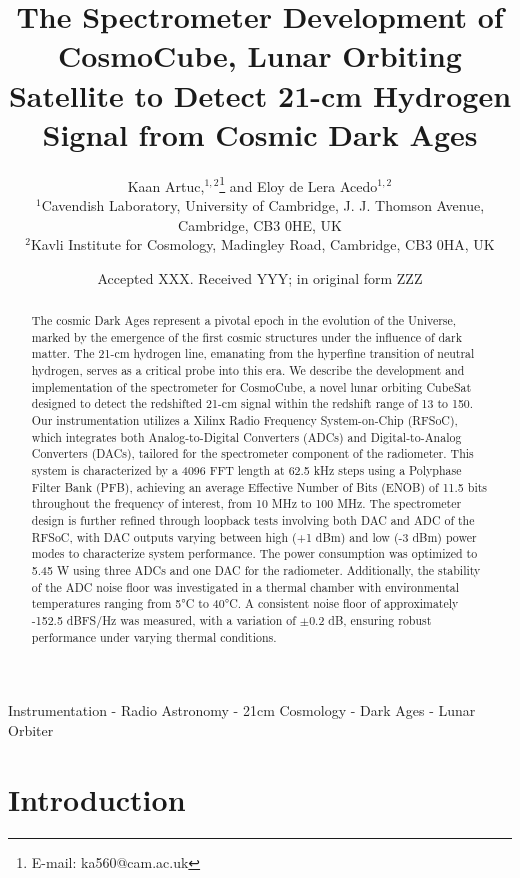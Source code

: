 \documentclass[fleqn,usenatbib]{rasti}
\title[The Spectrometer Development of CosmoCube to Detect 21-cm Signal]{The Spectrometer Development of CosmoCube, Lunar Orbiting Satellite to Detect 21-cm Hydrogen Signal from Cosmic Dark Ages}
\author[K. Artuc et al.]{
Kaan Artuc,$^{1,2}$\thanks{E-mail: ka560@cam.ac.uk}
and Eloy de Lera Acedo$^{1,2}$
\\
$^{1}$Cavendish Laboratory, University of Cambridge, J. J. Thomson Avenue, Cambridge, CB3 0HE, UK\\
$^{2}$Kavli Institute for Cosmology, Madingley Road, Cambridge, CB3 0HA, UK
}
\date{Accepted XXX. Received YYY; in original form ZZZ}
\begin{document}
\label{firstpage}
\pagerange{\pageref{firstpage}--\pageref{lastpage}}
\maketitle

\begin{abstract}
The cosmic Dark Ages represent a pivotal epoch in the evolution of the Universe, marked by the emergence of the first cosmic structures under the influence of dark matter. The 21-cm hydrogen line, emanating from the hyperfine transition of neutral hydrogen, serves as a critical probe into this era. We describe the development and implementation of the spectrometer for CosmoCube, a novel lunar orbiting CubeSat designed to detect the redshifted 21-cm signal within the redshift range of 13 to 150. Our instrumentation utilizes a Xilinx Radio Frequency System-on-Chip (RFSoC), which integrates both Analog-to-Digital Converters (ADCs) and Digital-to-Analog Converters (DACs), tailored for the spectrometer component of the radiometer. This system is characterized by a 4096 FFT length at 62.5 kHz steps using a Polyphase Filter Bank (PFB), achieving an average Effective Number of Bits (ENOB) of 11.5 bits throughout the frequency of interest, from 10 MHz to 100 MHz. The spectrometer design is further refined through loopback tests involving both DAC and ADC of the RFSoC, with DAC outputs varying between high (+1 dBm) and low (-3 dBm) power modes to characterize system performance. The power consumption was optimized to 5.45 W using three ADCs and one DAC for the radiometer. Additionally, the stability of the ADC noise floor was investigated in a thermal chamber with environmental temperatures ranging from 5°C to 40°C. A consistent noise floor of approximately -152.5 dBFS/Hz was measured, with a variation of $\pm$0.2 dB, ensuring robust performance under varying thermal conditions.
\end{abstract}

\begin{keywords}
Instrumentation - Radio Astronomy - 21cm Cosmology - Dark Ages - Lunar Orbiter
\end{keywords}



\section{Introduction}
\end{document}
